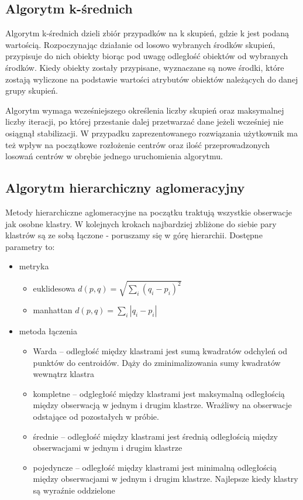\documentclass[a4paper,11pt]{article}
\begin{document}
\subsection{Algorytm k-średnich}

Algorytm k-średnich dzieli zbiór przypadków na k skupień, gdzie k jest podaną wartością. Rozpoczynając działanie od losowo wybranych środków skupień, przypisuje do nich obiekty biorąc pod uwagę odległość obiektów od wybranych środków. Kiedy obiekty zostały przypisane, wyznaczane są nowe środki, które zostają wyliczone na podstawie wartości atrybutów obiektów należących do danej grupy skupień.

Algorytm wymaga wcześniejszego określenia liczby skupień oraz maksymalnej liczby iteracji, po której przestanie dalej przetwarzać dane jeżeli wcześniej nie osiągnął stabilizacji. W przypadku zaprezentowanego rozwiązania użytkownik ma też wpływ na początkowe rozłożenie centrów oraz ilość przeprowadzonych losowań centrów w obrębie jednego uruchomienia algorytmu. 

\subsection{Algorytm hierarchiczny aglomeracyjny}
Metody hierarchiczne aglomeracyjne na początku traktują wszystkie obserwacje jak osobne klastry. W kolejnych krokach najbardziej zbliżone do siebie pary klastrów są ze sobą łączone - poruszamy się w górę hierarchii.
Dostępne parametry to:
\begin{itemize}
    \item metryka
    \begin{itemize}
        \item euklidesowa $ d\left( p,q\right) = \sqrt {\sum _{i} \left( q_{i}-p_{i}\right)^2 } $
        \item manhattan $ d\left( p,q\right) = \sum _{i} \left| q_{i}-p_{i}\right| $
    \end{itemize}
    \item metoda łączenia
    \begin{itemize}
        \item Warda -- odległość między klastrami jest sumą kwadratów odchyleń od punktów do centroidów. Dąży do zminimalizowania sumy kwadratów wewnątrz klastra
        \item kompletne -- odgległość między klastrami jest maksymalną odległością między obserwacją w jednym i drugim klastrze. Wrażliwy na obserwacje odstające od pozostałych w próbie.
        \item średnie -- odległość między klastrami jest średnią odległością między obserwacjami w jednym i drugim klastrze
        \item pojedyncze -- odległość między klastrami jest minimalną odległością między obserwacjami w jednym i drugim klastrze. Najlepsze kiedy klastry są wyraźnie oddzielone 
    \end{itemize}
\end{itemize}
\end{document}
